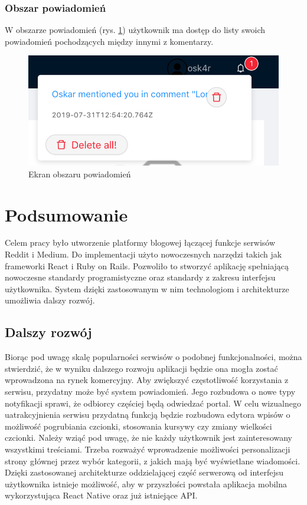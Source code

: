 \documentclass[declaration,shortabstract,polish,inz]{iithesis}
\begin{document}
\subsection{Obszar powiadomień}
W obszarze powiadomień (rys. \ref{fig:notification}) użytkownik ma dostęp do listy swoich powiadomień pochodzących między innymi z komentarzy.
\begin{figure}[H]
    \centering
    \includegraphics[width=\linewidth]{images/powiadomienia.png}
    \caption{Ekran obszaru powiadomień}
    \label{fig:notification}
\end{figure}


\chapter{Podsumowanie}
Celem pracy było utworzenie platformy blogowej łączącej funkcje serwisów Reddit i Medium. Do implementacji użyto nowoczesnych narzędzi takich jak frameworki React i Ruby on Rails. Pozwoliło to stworzyć aplikację spełniającą nowoczesne standardy programistyczne oraz standardy z zakresu interfejsu użytkownika. System dzięki zastosowanym w nim technologiom i architekturze umożliwia dalszy rozwój.

\section{Dalszy rozwój}

Biorąc pod uwagę skalę popularności serwisów o podobnej funkcjonalności, można stwierdzić, że w wyniku dalszego rozwoju aplikacji będzie ona mogła zostać wprowadzona na rynek komercyjny. Aby zwiększyć częstotliwość korzystania z serwisu, przydatny może być system powiadomień. Jego rozbudowa o nowe typy notyfikacji sprawi, że odbiorcy częściej będą odwiedzać portal. W celu wizualnego uatrakcyjnienia serwisu przydatną funkcją będzie rozbudowa edytora wpisów o możliwość pogrubiania czcionki, stosowania kursywy czy zmiany wielkości czcionki. Należy wziąć pod uwagę, że nie każdy użytkownik jest zainteresowany wszystkimi treściami. Trzeba rozważyć wprowadzenie możliwości personalizacji strony głównej przez wybór kategorii, z jakich mają być wyświetlane wiadomości. Dzięki zastosowanej architekturze oddzielającej część serwerową od interfejsu użytkownika istnieje możliwość, aby w przyszłości powstała aplikacja mobilna wykorzystująca React Native oraz już istniejące API.
\end{document}
